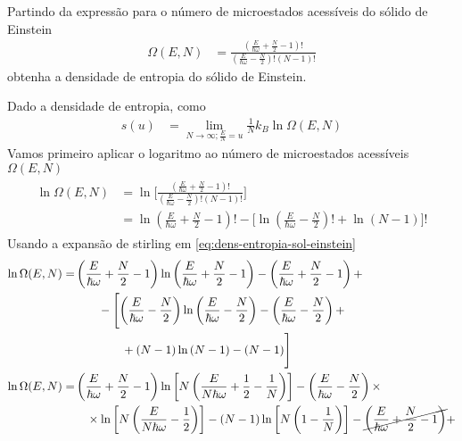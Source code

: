 \begin{prob}
	Partindo da expressão para o número de microestados acessíveis do sólido de Einstein
	\begin{align}
		\Omega(E,N)&=\frac{\left(\frac{E}{\hbar\omega}+\frac{N}{2}-1\right)!}{\left(\frac{E}{\hbar\omega}-\frac{N}{2}\right)!\left(N-1\right)!}
	\end{align}
	obtenha a densidade de entropia do sólido de Einstein.
	\begin{sol}
		Dado a densidade de entropia, como
		\begin{align}
			\label{eq:post-entropia}
			s(u)&=\displaystyle \lim_{N \to \infty;\frac{E}{N}=u}\frac{1}{N}k_B\ln\Omega(E,N)
		\end{align}
		Vamos primeiro aplicar o logaritmo ao número de microestados acessíveis $\Omega(E,N)$
		\begin{align}
			\label{eq:dens-entropia-sol-einstein}
			\begin{split}
				\ln\Omega(E,N)&=\ln\Biggl[\frac{\left(\frac{E}{\hbar\omega}+\frac{N}{2}-1\right)!}{\left(\frac{E}{\hbar\omega}-\frac{N}{2}\right)!\left(N-1\right)!}\Biggr]\\
				&=\ln\left(\frac{E}{\hbar\omega}+\frac{N}{2}-1\right)!-\biggl[\ln\left(\frac{E}{\hbar\omega}-\frac{N}{2}\right)!+\ln\left(N-1\right)\biggr]!
			\end{split}
		\end{align}
		Usando a expansão de stirling em \eqref{eq:dens-entropia-sol-einstein}
		\begin{align}
			\begin{split}
				\ln\Omega(E,N)=&\left(\frac{E}{\hbar\omega}+\frac{N}{2}-1\right)\ln\left(\frac{E}{\hbar\omega}+\frac{N}{2}-1\right)-\left(\frac{E}{\hbar\omega}+\frac{N}{2}-1\right)+\\
				&\qquad-\Biggl[\left(\frac{E}{\hbar\omega}-\frac{N}{2}\right)\ln\left(\frac{E}{\hbar\omega}-\frac{N}{2}\right)-\left(\frac{E}{\hbar\omega}-\frac{N}{2}\right)+\\&\qquad\qquad+\left(N-1\right)\ln\left(N-1\right)-\left(N-1\right)\Biggr]\\
				\ln\Omega(E,N)=&\left(\frac{E}{\hbar\omega}+\frac{N}{2}-1\right)\ln\left[N\left(\frac{E}{N\hbar\omega}+\frac{1}{2}-\frac{1}{N}\right)\right]-\left(\frac{E}{\hbar\omega}-\frac{N}{2}\right)\times\\&\quad\times\ln\left[N\left(\frac{E}{N\hbar\omega}-\frac{1}{2}\right)\right]-(N-1)\ln\left[N\left(1-\frac{1}{N}\right)\right]-\cancel{\left(\frac{E}{\hbar\omega}+{\frac{N}{2}}-{1}\right)}+\\

\end{split}
\end{align}
\end{sol}
\end{prob}
